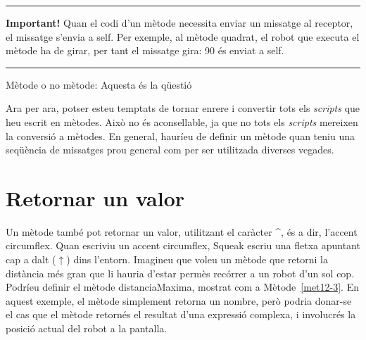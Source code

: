 \noindent
\rule{\textwidth}{2pt}
\noindent
\textbf{Important!} Quan el codi d'un mètode necessita enviar un missatge al receptor, el missatge s'envia a \textsf{self}. Per exemple, al mètode \textsf{quadrat}, el robot que executa el mètode ha de girar, per tant el missatge \textsf{gira: 90} és enviat a \textsf{self}.\\
\noindent
\rule{\textwidth}{2pt}
\vspace*{4mm}

\noindent
{\large Mètode o no mètode: Aquesta és la qüestió}
\vspace{3mm}

Ara per ara, potser esteu temptats de tornar enrere i convertir tots els \emph{scripts} que heu escrit en mètodes. Això no és aconsellable, ja que no tots els \emph{scripts} mereixen la conversió a mètodes. En general, hauríeu  de definir un mètode quan teniu una seqüència de missatges prou general com per ser utilitzada diverses vegades. 

\section{Retornar un valor}
Un mètode també pot retornar un valor, utilitzant el caràcter \textasciicircum, és a dir, l'accent circumflex. Quan escriviu un accent circumflex, Squeak escriu una fletxa apuntant cap a dalt ($\uparrow$) dins l'entorn. Imagineu que voleu un mètode que retorni la distància més gran que li hauria d'estar permès recórrer a un robot d'un sol cop. Podríeu definir el mètode \textsf{distanciaMaxima}, mostrat com a Mètode~\ref{met12-3}. En aquest exemple, el mètode simplement retorna un nombre, però podria donar-se el cas que el mètode retornés el resultat d'una expressió complexa, i involucrés la posició actual del robot a la pantalla.

\newpage


